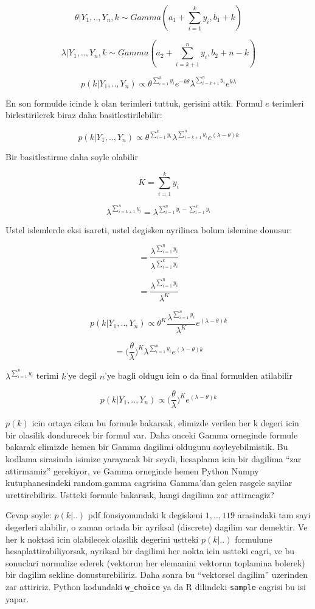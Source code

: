 \documentclass[12pt,fleqn]{article}\usepackage{../common}
\begin{document}
\[ \theta | Y_1,..,Y_n,k \sim Gamma(a_1 + \sum_{i=1}^{k} y_i, b_1+k) \]

\[ \lambda | Y_1,..,Y_n,k \sim Gamma(a_2 + \sum_{i=k+1}^{n} y_i, b_2+n-k) \]

\[ 
p(k | Y_1,..,Y_n) \propto \theta^{\sum_{i=1}^{k} y_i}e^{-k\theta} 
\lambda^{\sum_{i=k+1}^n y_i}e^{k\lambda} 
 \]

En son formulde icinde k olan terimleri tuttuk, gerisini attik. Formul $e$
terimleri birlestirilerek biraz daha basitlestirilebilir:

\[ p(k | Y_1,..,Y_n) \propto
\theta^{\sum_{i=1}^{k} y_i} \lambda^{\sum_{i=k+1}^n y_i}e^{(\lambda-\theta)k} 
 \]

Bir basitlestirme daha soyle olabilir

\[ K = \sum_{i=1}^{k} y_i  \]

\[ \lambda^{\sum_{i=k+1}^n y_i} = \lambda^{\sum_{i=1}^n y_i - \sum_{i=1}^k y_i} \]

Ustel islemlerde eksi isareti, ustel degisken ayrilinca bolum islemine donusur:

\[ = \frac{\lambda^{\sum_{i=1}^n y_i}}{\lambda ^{\sum_{i=1}^k y_i}} \]

\[ = \frac{\lambda^{\sum_{i=1}^n y_i}}{\lambda ^{K}} \]

\[ p(k | Y_1,..,Y_n) \propto 
\theta^{K} \frac{\lambda^{\sum_{i=1}^n y_i}}{\lambda ^{K}} e^{(\lambda-\theta)k} 
 \]

\[ = \bigg(\frac{\theta}{\lambda}\bigg)^{K} \lambda^{\sum_{i=1}^n  y_i} e^{(\lambda-\theta)k} \]

$\lambda^{\sum_{i=1}^n y_i}$ terimi $k$'ye degil $n$'ye bagli oldugu
icin o da final formulden atilabilir

\[ 
p(k | Y_1,..,Y_n) \propto \bigg(\frac{\theta}{\lambda}\bigg)^{K} 
e^{(\lambda-\theta)k}  
\]

$p(k)$ icin ortaya cikan bu formule bakarsak, elimizde verilen her k
degeri icin bir olasilik dondurecek bir formul var. Daha onceki Gamma
orneginde formule bakarak elimizde hemen bir Gamma dagilimi oldugunu
soyleyebilmistik. Bu kodlama sirasinda isimize yarayacak bir seydi,
hesaplama icin bir dagilima ``zar attirmamiz'' gerekiyor, ve Gamma
orneginde hemen Python Numpy kutuphanesindeki random.gamma cagrisina
Gamma'dan gelen rasgele sayilar urettirebiliriz. Ustteki formule
bakarsak, hangi dagilima zar attiracagiz?

Cevap soyle: $p(k|..)$ pdf fonsiyonundaki k degiskeni $1,..,119$ arasindaki
tam sayi degerleri alabilir, o zaman ortada bir ayriksal (discrete) dagilim
var demektir. Ve her k noktasi icin olabilecek olasilik degerini ustteki
$p(k|..)$ formulune hesaplattirabiliyorsak, ayriksal bir dagilimi her nokta
icin ustteki cagri, ve bu sonuclari normalize ederek (vektorun her
elemanini vektorun toplamina bolerek) bir dagilim sekline
donusturebiliriz. Daha sonra bu ``vektorsel dagilim'' uzerinden zar
attiririz. Python kodundaki \verb!w_choice! ya da R dilindeki \verb!sample!
cagrisi bu isi yapar.
\end{document}
